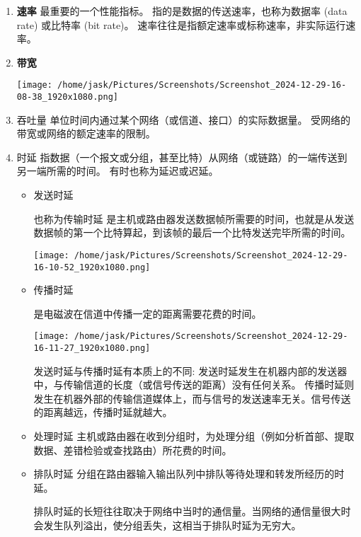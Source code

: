 \documentclass[11pt]{article}
\begin{document}
\begin{enumerate}
\item \textbf{速率}
最重要的一个性能指标。
指的是数据的传送速率，也称为数据率 (data rate) 或比特率 (bit rate)。
速率往往是指额定速率或标称速率，非实际运行速率。
\item \textbf{带宽}
\begin{center}
\texttt{[image: /home/jask/Pictures/Screenshots/Screenshot\_2024-12-29-16-08-38\_1920x1080.png]}
\end{center}
\item 吞吐量
单位时间内通过某个网络（或信道、接口）的实际数据量。
受网络的带宽或网络的额定速率的限制。
\item 时延
指数据（一个报文或分组，甚至比特）从网络（或链路）的一端传送到另一端所需的时间。
有时也称为延迟或迟延。

\begin{itemize}
\item 发送时延

也称为传输时延
是主机或路由器发送数据帧所需要的时间，也就是从发送数据帧的第一个比特算起，到该帧的最后一个比特发送完毕所需的时间。

\begin{center}
\texttt{[image: /home/jask/Pictures/Screenshots/Screenshot\_2024-12-29-16-10-52\_1920x1080.png]}
\end{center}

\item 传播时延

是电磁波在信道中传播一定的距离需要花费的时间。

\begin{center}
\texttt{[image: /home/jask/Pictures/Screenshots/Screenshot\_2024-12-29-16-11-27\_1920x1080.png]}
\end{center}

发送时延与传播时延有本质上的不同:
发送时延发生在机器内部的发送器中，与传输信道的长度（或信号传送的距离）没有任何关系。
传播时延则发生在机器外部的传输信道媒体上，而与信号的发送速率无关。信号传送的距离越远，传播时延就越大。

\item 处理时延
主机或路由器在收到分组时，为处理分组（例如分析首部、提取数据、差错检验或查找路由）所花费的时间。

\item 排队时延
分组在路由器输入输出队列中排队等待处理和转发所经历的时延。

排队时延的长短往往取决于网络中当时的通信量。当网络的通信量很大时会发生队列溢出，使分组丢失，这相当于排队时延为无穷大。
\end{itemize}
\end{enumerate}
\end{document}
